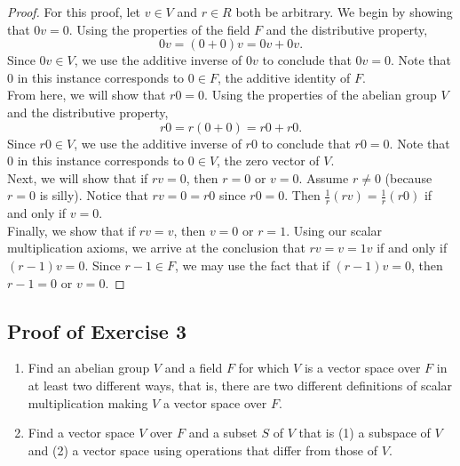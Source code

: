 \begin{proof}
For this proof, let $v\in V$ and $r\in R$ both be arbitrary. We begin by showing that $0v=0$. Using the properties of the field $F$ and the distributive property,
\[0v = (0 + 0)v = 0v + 0v.\]
Since $0v\in V$, we use the additive inverse of $0v$ to conclude that $0v=0$. Note that $0$ in this instance corresponds to $0\in F$, the additive identity of $F$.\\

From here, we will show that $r0=0$. Using the properties of the abelian group $V$ and the distributive property,
\[r0 = r(0 + 0) = r0 + r0.\]
Since $r0\in V$, we use the additive inverse of $r0$ to conclude that $r0=0$. Note that $0$ in this instance corresponds to $0\in V$, the zero vector of $V$.\\

Next, we will show that if $rv = 0$, then $r = 0$ or $v = 0$. Assume $r\neq 0$ (because $r = 0$ is silly). Notice that $rv = 0 = r0$ since $r0 = 0$. Then $\frac{1}{r}(rv) = \frac{1}{r}(r0)$ if and only if $v = 0$.\\

Finally, we show that if $rv=v$, then $v=0$ or $r=1$. Using our scalar multiplication axioms, we arrive at the conclusion that $rv = v = 1v$ if and only if $(r - 1)v = 0$. Since $r - 1\in F$, we may use the fact that if $(r - 1)v = 0$, then $r - 1 = 0$ or $v = 0$.
\end{proof}

\vfill
\pagebreak

\subsection{Proof of Exercise 3}
\begin{enumerate}[label=\alph*.]
	\item Find an abelian group $V$ and a field $F$ for which $V$ is a vector space over $F$ in at least two different ways, that is, there are two different definitions of scalar multiplication making $V$ a vector space over $F$.
	\item Find a vector space $V$ over $F$ and a subset $S$ of $V$ that is (1) a subspace of $V$ and (2) a vector space using operations that differ from those of $V$.
\end{enumerate}

